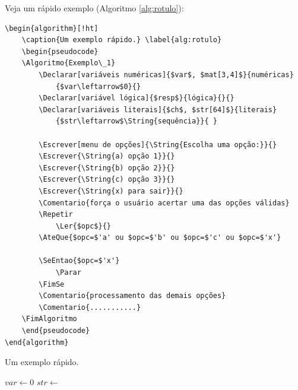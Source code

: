 \documentclass[a4paper,12pt,oneside,onecolumn,final,fleqn]{repUERJ}
\begin{document}
Veja um rápido exemplo (Algoritmo \ref{alg:rotulo}):
\begin{verbatim}
\begin{algorithm}[!ht]
    \caption{Um exemplo rápido.} \label{alg:rotulo}
    \begin{pseudocode}
    \Algoritmo{Exemplo\_1}
        \Declarar[variáveis numéricas]{$var$, $mat[3,4]$}{numéricas}
            {$var\leftarrow$0}{}
        \Declarar[variável lógica]{$resp$}{lógica}{}{}
        \Declarar[variáveis literais]{$ch$, $str[64]$}{literais}
            {$str\leftarrow$\String{sequência}}{ }
        
        \Escrever[menu de opções]{\String{Escolha uma opção:}}{}
        \Escrever{\String{a) opção 1}}{}
        \Escrever{\String{b) opção 2}}{}
        \Escrever{\String{c) opção 3}}{}
        \Escrever{\String{x) para sair}}{}
        \Comentario{força o usuário acertar uma das opções válidas}
        \Repetir
            \Ler{$opc$}{}
        \AteQue{$opc=$'a' ou $opc=$'b' ou $opc=$'c' ou $opc=$'x'}
        
        \SeEntao{$opc=$'x'}
            \Parar
        \FimSe
        \Comentario{processamento das demais opções}
        \Comentario{...........}
    \FimAlgoritmo
    \end{pseudocode}
\end{algorithm}
\end{verbatim}

\begin{algorithm}[!ht]
    \caption{Um exemplo rápido.} \label{alg:rotulo}
    \begin{pseudocode}
            {$var\leftarrow$0}{}
            {$str\leftarrow$}{}
        
        \Repetir
        
            \Parar
        \FimSe
    \FimAlgoritmo
    \end{pseudocode}
\end{algorithm}
\end{document}
